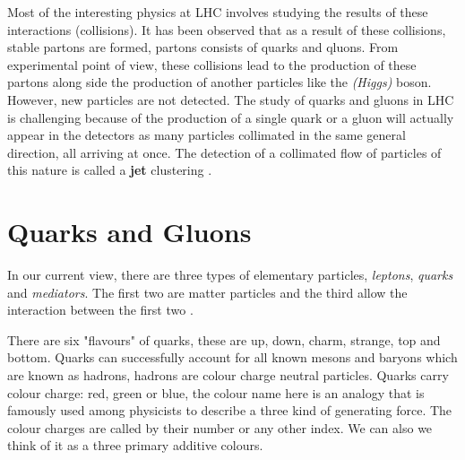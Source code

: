 Most of the interesting physics at LHC involves studying the results of these interactions (collisions). It has been observed that as a result of these collisions, stable partons are formed, partons consists of quarks and qluons. From experimental point of view, these collisions lead to the production of these partons along side the production of another particles like the \emph{(Higgs)} boson. However, new particles are not detected.
The study of quarks and gluons in LHC is challenging because of the production of a single quark or a gluon will actually appear in the detectors as many particles collimated in the same general direction, all arriving at once. The detection of a collimated flow of particles of this nature is called a \textbf{jet} clustering\label{Lhc} \citep{Ellis:2007ib}.   



\section{Quarks and Gluons}
In our current view, there are three types of elementary particles, \emph{leptons}, \emph{quarks} and \emph{mediators}. The first two are matter particles and the third allow the interaction between the first two \citep{griffiths2008introduction}.

There are six "flavours" of quarks, these are up, down, charm, strange, top and bottom.
Quarks can successfully account for all known mesons and baryons which are known as hadrons, hadrons are colour charge neutral particles. 
%
%
Quarks carry colour charge: red, green or blue, the colour name here is an analogy  that is famously used among physicists to describe a three kind of generating force. The colour charges are called by their number or any other index. We can also we think of it as a three primary additive colours. 

